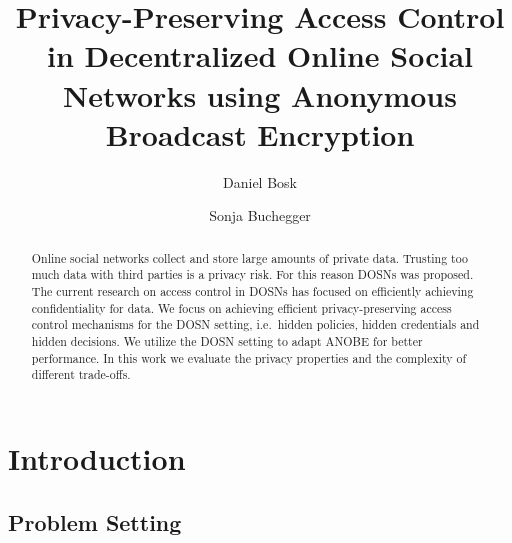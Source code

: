 \title{%
  Privacy-Preserving Access Control in
  Decentralized Online Social Networks using
  Anonymous Broadcast Encryption
}
\author{%
  Daniel Bosk \and
  Sonja Buchegger
}


\mode*

\begin{abstract}
  Online social networks collect and store large amounts of private data.
  Trusting too much data with third parties is a privacy risk.
  For this reason \acp{DOSN} was proposed.
  The current research on access control in \acp{DOSN} has focused on 
  efficiently achieving confidentiality for data.
  We focus on achieving efficient privacy-preserving access control mechanisms 
  for the \ac{DOSN} setting, i.e.~hidden policies, hidden credentials and 
  hidden decisions.
  We utilize the \ac{DOSN} setting to adapt \ac{ANOBE} for better performance.
  In this work we evaluate the privacy properties and the complexity of 
  different trade-offs.

\end{abstract}

\acresetall{}
\section{Introduction}

\subsection<presentation>{Problem Setting}

